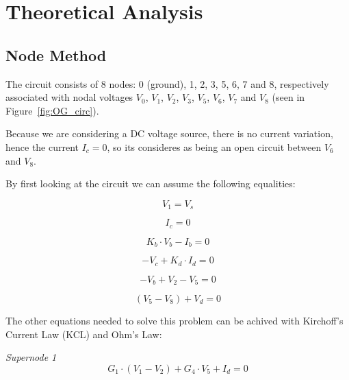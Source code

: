 \section{Theoretical Analysis}
\label{sec:analysis}

\subsection{Node Method}
\label{subsec:node}


The circuit consists of 8 nodes: 0 (ground), 1, 2, 3, 5, 6, 7 and 8, respectively associated with nodal voltages $V_0$, $V_1$, $V_2$, $V_3$, $V_5$, $V_6$, $V_7$ and $V_8$ (seen in Figure~\ref{fig:OG_circ}). 


Because we are considering a DC voltage source, there is no current variation, hence the current $I_c=0$, so its consideres as being an open circuit between $V_6$ and $V_8$.

By first looking at the circuit we can assume the following equalities:


\begin{equation}
  V_1=V_s
  \label{eq:N_1}
\end{equation}


\begin{equation}
    I_c=0
    \label{eq:aux}
\end{equation}


\begin{equation}
    K_b\cdot V_b - I_b =0
    \label{eq:aux1}
\end{equation}


\begin{equation}
    -V_c + K_d \cdot I_d=0
    \label{eq:aux2}
\end{equation}


\begin{equation}
    -V_b + V_2 - V_5 = 0
    \label{}
\end{equation}

 \begin{equation}
     (V_5-V_8) + V_d=0
 \end{equation}





The other equations needed to solve this problem can be achived with Kirchoff's Current Law (KCL) and Ohm's Law:

\textit{Supernode 1}
\begin{equation}
    G_1 \cdot (V_1 - V_2) + G_4 \cdot V_5 +I_d=0
 \end{equation}
 


